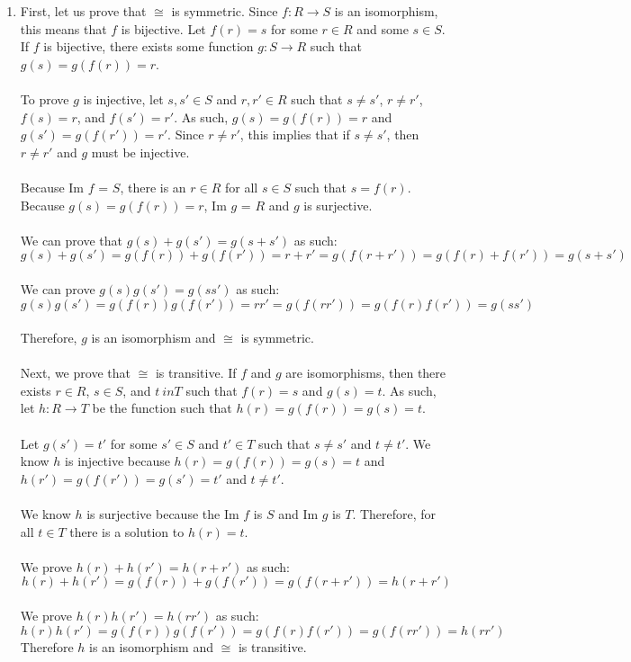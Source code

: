 \documentclass{article}
\begin{document}
\begin{enumerate}
\item First, let us prove that $\cong$ is symmetric.
Since $f: R \rightarrow S$ is an isomorphism, this means that $f$ is bijective.
Let $f(r) = s$ for some $r \in R$ and some $s \in S$.
If $f$ is bijective, there exists some function $g: S \rightarrow R$ such that
$g(s) = g(f(r)) = r$. \\ \\
To prove $g$ is injective, let $s, s' \in S$ and $r, r' \in R$ such that
$s \neq s'$, $r \neq r'$, $f(s) = r$, and $f(s') = r'$.  As such,
$g(s) = g(f(r)) = r$ and $g(s') = g(f(r')) = r'$.  Since $r \neq r'$, this
implies that if $s \neq s'$, then $r \neq r'$ and $g$ must be injective. \\ \\
Because Im $f$ = $S$, there is an $r \in R$ for all $s \in S$ such that
$s = f(r)$.  Because $g(s) = g(f(r)) = r$, Im $g$ = $R$ and $g$ is surjective. \\ \\
We can prove that $g(s) + g(s') = g(s + s')$ as such: \\
\[
g(s) + g(s') = g(f(r)) + g(f(r')) = r + r' = g(f(r + r')) = g(f(r) + f(r')) = g(s + s')
\]
\\
We can prove $g(s)g(s') = g(ss')$ as such:
\[
g(s)g(s') = g(f(r))g(f(r')) = rr' = g(f(rr')) = g(f(r)f(r')) = g(ss')
\]
\\
Therefore, $g$ is an isomorphism and $\cong$ is symmetric.
\\ \\
Next, we prove that $\cong$ is transitive.  If $f$ and $g$ are isomorphisms,
then there exists $r \in R$, $s \in S$, and $t \ in T$ such that
$f(r) = s$ and $g(s) = t$.  As such, let $h: R \rightarrow T$ be the function
such that $h(r) = g(f(r)) = g(s) = t$. \\ \\
Let $g(s') = t'$ for some $s' \in S$ and $t' \in T$ such that
$s \neq s'$ and $t \neq t'$.
We know $h$ is injective because $h(r) = g(f(r)) = g(s) = t$ and
$h(r') = g(f(r')) = g(s') = t'$ and $t \neq t'$.
\\ \\
We know $h$ is surjective because the Im $f$ is $S$ and Im $g$ is $T$.
Therefore, for all $t \in T$ there is a solution to $h(r) = t$.
\\ \\
We prove $h(r) + h(r') = h(r + r')$ as such:
\[
h(r) + h(r') = g(f(r)) + g(f(r')) = g(f(r + r')) = h(r + r')
\]
\\
We prove $h(r)h(r') = h(rr')$ as such:
\[
h(r)h(r') = g(f(r))g(f(r')) = g(f(r)f(r')) = g(f(rr')) = h(rr')
\]
Therefore $h$ is an isomorphism and $\cong$ is transitive.


\end{enumerate}
\end{document}
